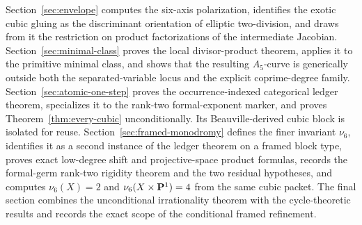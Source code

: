 Section~\ref{sec:envelope} computes the six-axis polarization, identifies the
exotic cubic gluing as the discriminant orientation of elliptic two-division,
and draws from it the restriction on product
factorizations of the intermediate Jacobian.
Section~\ref{sec:minimal-class} proves the local divisor-product theorem,
applies it to the primitive minimal class, and shows that the resulting
\(A_5\)-curve is generically outside both the separated-variable locus and
the explicit coprime-degree family.
Section~\ref{sec:atomic-one-step} proves the occurrence-indexed categorical
ledger theorem, specializes it to the rank-two formal-exponent marker, and proves
Theorem~\ref{thm:every-cubic} unconditionally.  Its Beauville-derived cubic
block is isolated for reuse.
Section~\ref{sec:framed-monodromy} defines the finer invariant \(\nu_6\),
identifies it as a second instance of the ledger theorem on a framed block
type, proves exact low-degree shift and projective-space product formulas,
records the formal-germ rank-two rigidity theorem and the two residual
hypotheses, and computes \(\nu_6(X)=2\) and
\(\nu_6(X\times\mathbf P^1)=4\) from the same cubic packet.  The final section
combines the unconditional irrationality theorem with the cycle-theoretic
results and records the exact scope of the conditional framed refinement.

